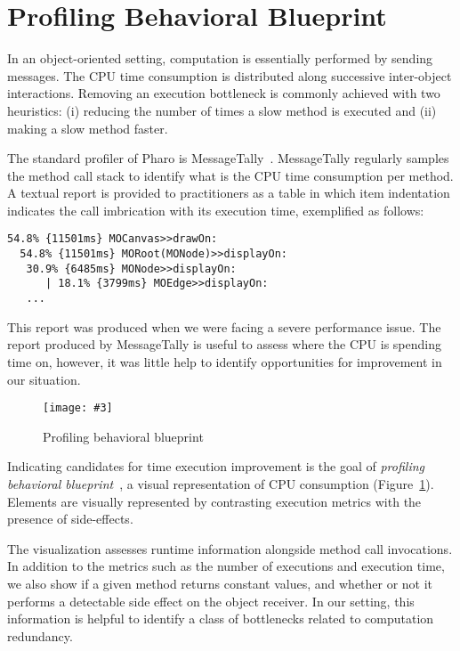 \documentclass[runningheads]{llncs}
\newcommand{\sd}[1]{\nb{SD}{orange}{#1}}
\newcommand{\fig}[4]{
	\begin{figure}[#1]
		\centering
		\texttt{[image: \#3]}
		\caption{\label{fig:#3}#4}
	\end{figure}}
\newcommand{\seclabel}[1]{\label{sec:#1}}
\newcommand{\figref}[1]{Figure~\ref{fig:#1}}
\newcommand{\myparagraph}[1]{\noindent \textbf{#1.}}
\begin{document}

\section{Profiling Behavioral Blueprint}\seclabel{profilingblueprint}

In an object-oriented setting, computation is essentially performed by sending messages. The CPU time consumption is distributed along successive inter-object interactions. Removing an execution bottleneck is commonly achieved with two heuristics: (i) reducing the number of times a slow method is executed and (ii) making a slow method faster.

The standard profiler of Pharo is MessageTally~\cite{Berg11d}. MessageTally regularly samples the method call stack to identify what is the CPU time consumption per method. A textual report is provided to practitioners as a table in which item indentation indicates the call imbrication with its execution time, exemplified as follows: 

\begin{lstlisting}
54.8% {11501ms} MOCanvas>>drawOn: 
  54.8% {11501ms} MORoot(MONode)>>displayOn: 
   30.9% {6485ms} MONode>>displayOn: 
      | 18.1% {3799ms} MOEdge>>displayOn: 
   ...
\end{lstlisting}

This report was produced when we were facing a severe performance issue. The report produced by MessageTally is useful to assess where the CPU is spending time on, however, it was little help to identify opportunities for improvement in our situation. 

\fig{}{1.0}{ProfilingBlueprint}{Profiling behavioral blueprint}
Indicating candidates for time execution improvement is the goal of \emph{profiling behavioral blueprint}~\cite{Berg10c}, a visual representation of CPU consumption (\figref{ProfilingBlueprint}). Elements are visually represented by contrasting execution metrics with the presence of side-effects.
\sd{put a ref to polymetric views.}

The visualization assesses runtime information alongside method call invocations. In addition to the metrics such as the number of executions and execution time, we also show if a given method returns constant values, and whether or not it performs a detectable side effect on the object receiver. In our setting, this information is helpful to identify a class of bottlenecks related to computation redundancy.
\end{document}
